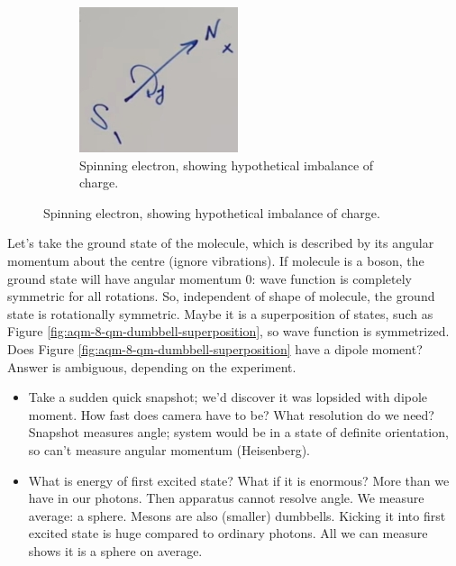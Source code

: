 \documentclass[]{article}
\begin{document}
\begin{figure}[H]
\begin{subfigure}[t]{0.3\textwidth}
	\end{subfigure}
	\begin{subfigure}[t]{0.3\textwidth}
		\caption{Spinning electron, showing hypothetical imbalance of charge.}\label{fig:aqm-8-electron-spin}
		\includegraphics[width=\textwidth]{aqm-8-electron-spin}
	\end{subfigure}
\end{figure}
Let's take the ground state of the molecule, which is described by its angular momentum about the centre (ignore vibrations). If molecule is a boson, the ground state will have angular momentum $0$: wave function is completely symmetric for all rotations. So, independent of shape of molecule, the ground state is rotationally symmetric. Maybe it is a superposition of states, such as Figure \ref{fig:aqm-8-qm-dumbbell-superposition}, so wave function is symmetrized. Does Figure \ref{fig:aqm-8-qm-dumbbell-superposition} have a dipole moment? Answer is ambiguous, depending on the experiment.
\begin{itemize}
	\item Take a sudden quick snapshot; we'd discover it was lopsided with dipole moment. How fast does camera have to be? What resolution do we need? Snapshot measures angle; system would be in a state of definite orientation, so can't measure angular momentum (Heisenberg).
	\item What is energy of first excited state? What if it is enormous? More than we have in our photons. Then apparatus cannot resolve angle. We measure average: a sphere. Mesons are also (smaller) dumbbells. Kicking it into first excited state is huge compared to ordinary photons. All we can measure shows it is a sphere on average.
\end{itemize}
\end{document}
